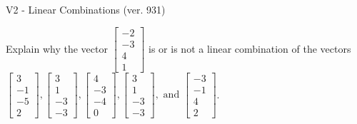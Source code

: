 \begin{exercise}
  \begin{exerciseTitle}V2 - Linear Combinations (ver. 931)\end{exerciseTitle}
  \begin{exerciseStatement}
    Explain why the vector \(\left[\begin{array}{c}
-2 \\
-3 \\
4 \\
1
\end{array}\right]\)  is or is not a linear 
	combination of the vectors \(\left[\begin{array}{c}
3 \\
-1 \\
-5 \\
2
\end{array}\right] , \left[\begin{array}{c}
3 \\
1 \\
-3 \\
-3
\end{array}\right] , \left[\begin{array}{c}
4 \\
-3 \\
-4 \\
0
\end{array}\right] , \left[\begin{array}{c}
3 \\
1 \\
-3 \\
-3
\end{array}\right] , \text{ and } \left[\begin{array}{c}
-3 \\
-1 \\
4 \\
2
\end{array}\right]\).
	



\end{exerciseStatement}
\end{exercise}
